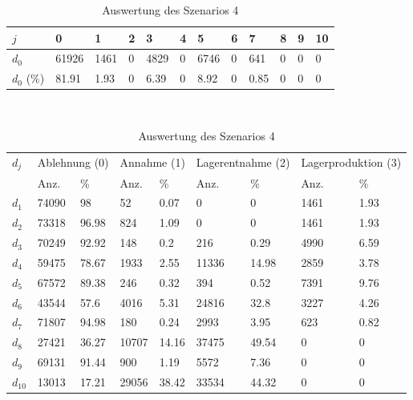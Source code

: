 \begin{table}[h!]
\renewcommand{\arraystretch}{1.5}
  \begin{center}
    \caption{Auswertung des Szenarios 4}  \label{AS4}
    \vspace*{3mm}
    \begin{tabular}{l l l l l l l l l l l l }  \hline 
         $j$ & 0 & 1  & 2 & 3 & 4  & 5 & 6 & 7 & 8 & 9 & 10  \\  \hline
$d_{0}$ &  61926 &  1461 &  0 &  4829 &  0 &  6746 &  0 &  641 &  0 &  0 &  0 \\
$d_{0}$ (\%) &  81.91 &  1.93 &  0 &  6.39 &  0 &  8.92 &  0 &  0.85 &  0 &  0 &  0 \\\hline
    \end{tabular} \\[3mm]
        \begin{tabular}{ l l l l l l l l l}   \hline    %
    $d_j$ & \multicolumn{2}{c}{Ablehnung (0)} & \multicolumn{2}{c}{Annahme (1)}  & \multicolumn{2}{c}{Lagerentnahme (2)} & \multicolumn{2}{c}{Lagerproduktion (3)}\\
    & Anz. & \% & Anz. & \% & Anz. & \% & Anz. & \% \\ \hline 
$d_{1}$  &  74090 &     98 &     52 &   0.07 &    0 &    0 &  1461 &  1.93 \\
$d_{2}$  &  73318 &  96.98 &    824 &   1.09 &    0 &    0 &  1461 &  1.93 \\
$d_{3}$  &  70249 &  92.92 &    148 &    0.2 &    216 &   0.29 &  4990 &  6.59 \\
$d_{4}$  &  59475 &  78.67 &   1933 &   2.55 &  11336 &  14.98 &  2859 &  3.78 \\
$d_{5}$  &  67572 &  89.38 &    246 &   0.32 &    394 &   0.52 &  7391 &  9.76 \\
$d_{6}$  &  43544 &   57.6 &   4016 &   5.31 &  24816 &   32.8 &  3227 &  4.26 \\
$d_{7}$  &  71807 &  94.98 &    180 &   0.24 &   2993 &   3.95 &   623 &  0.82 \\
$d_{8}$  &  27421 &  36.27 &  10707 &  14.16 &  37475 &  49.54 &   0 &   0 \\
$d_{9}$  &  69131 &  91.44 &    900 &   1.19 &   5572 &   7.36 &   0 &   0 \\
$d_{10}$ &  13013 &  17.21 &  29056 &  38.42 &  33534 &  44.32 &   0 &   0 \\
          \hline
   \end{tabular} \\[3mm]
     \end{center}
\end{table}

